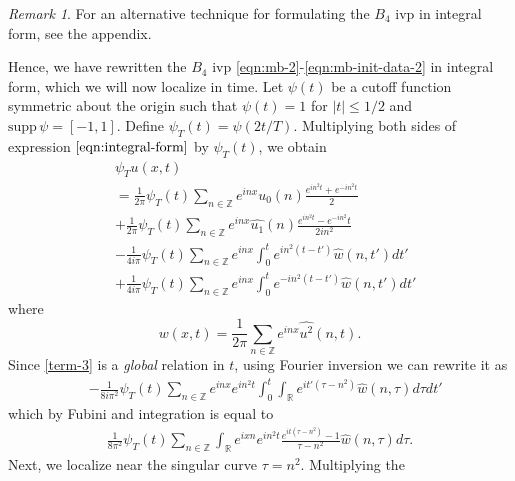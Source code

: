 \documentclass[12pt,reqno]{amsart}
\numberwithin{equation}{section}  %
\numberwithin{figure}{section}
\newcommand{\rr}{\mathbb{R}}
\newcommand{\zz}{\mathbb{Z}}
\newcommand{\wh}{\widehat}
\theoremstyle{plain}
\theoremstyle{definition}
\theoremstyle{remark}
\newtheorem{remark}{Remark}
\begin{document}
%
\begin{framed}
  \begin{remark}
For an alternative technique for formulating the $B_{4}$ ivp in integral form,
see the appendix.
\end{remark}
\end{framed}
Hence, we have rewritten the $B_{4}$ ivp
\eqref{eqn:mb-2}-\eqref{eqn:mb-init-data-2} in integral form, which we will now
localize in time. 
Let $\psi(t)$ be a cutoff function symmetric about the 
origin such that $\psi(t) = 1$ for $|t| \le 1/2$ and $\text{supp} \, \psi 
= [-1, 1 ]$.
Define $\psi_{T}(t) = \psi(2t/T)$.  Multiplying both sides of expression
$\eqref{eqn:integral-form}$ by $\psi_{T}(t)$, we obtain
%
%
\begin{align}
  & \psi_{T}u(x,t) 
    \\
    & = \frac{1}{2 \pi}\psi_{T}(t)
    \sum_{n \in \zz} e^{inx} \wh{u_{0}}(n) \frac{e^{in^{2}t} + e^{-in^{2}t}}{2} 
    \\
    & + \frac{1}{2 \pi}\psi_{T}(t) \sum_{n \in \zz} e^{inx}
    \wh{u_{1}}(n)\frac{e^{in^{2}t} - e^{-in^{2}}t}{2 i n^{2}} 
    \\
    \label{term-3}
    & - \frac{1}{4 i \pi}\psi_{T}(t) \sum_{n \in \zz} e^{inx}
    \int_{0}^{t}e^{in^{2}(t-t')}
    \wh{w}(n, t') dt'
    \\
    \label{term-4}
    & + \frac{1}{4 i \pi}\psi_{T}(t) \sum_{n \in \zz} e^{inx}
    \int_{0}^{t}e^{-in^{2}(t-t')}
    \wh{w}(n, t') dt'
  \end{align}
where $$w(x,t) = \frac{1}{2\pi} \sum_{n \in \zz}
e^{inx} \wh{u^{2}}(n,t).$$
Since \eqref{term-3} is a \emph{global} relation in $t$, using Fourier inversion
we can rewrite it as
%
%
\begin{equation*}
\begin{split}
  & - \frac{1}{8 i \pi^{2} } \psi_{T}(t) \sum_{n \in \zz} e^{inx} e^{in^{2}t}
  \int_{0}^{t} \int_{\rr} e^{it'(\tau - n^{2})} \wh{w}(n, \tau) d \tau dt'
\end{split}
\end{equation*}
%
%
which by Fubini and integration is equal to
%
%
\begin{equation*}
\begin{split}
  \frac{1}{8 \pi^{2}} \psi_{T} (t) \sum_{n \in \zz} \int_{\rr} e^{ixn}
  e^{in^{2}t} \frac{e^{it(\tau - n^{2})} -1}{ \tau - n^{2}}\wh{w}(n, \tau) d \tau.
\end{split}
\end{equation*}
%
Next, we localize near the singular curve $\tau =  n^2$.  Multiplying the
\end{document}
